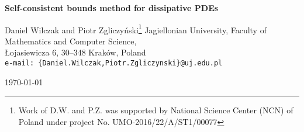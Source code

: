 \documentclass{article}
\begin{document}
\begin{center}
{\Large \bf  Self-consistent bounds method for dissipative PDEs}

 \vskip 0.5cm
{\large Daniel Wilczak} and {\large Piotr Zgliczy\'nski}\footnote{Work of D.W. and P.Z. was supported by National Science Center (NCN) of Poland under project No. UMO-2016/22/A/ST1/00077} %
 \vskip 0.2cm
  Jagiellonian University, Faculty of Mathematics and Computer Science, \\
  \L ojasiewicza 6, 30--348  Krak\'ow, Poland \\ \texttt{e-mail:\,\{Daniel.Wilczak,Piotr.Zgliczynski\}@uj.edu.pl}
\vskip 0.5cm

\today
\end{center}

\begin{abstract}
 We discuss the method of self-consistent bounds for dissipative PDEs with periodic boundary conditions. We prove convergence theorems for a class of dissipative PDEs, which constitute a theoretical basis of a general framework for construction of an algorithm that computes bounds for the solutions of the underlying PDE and its dependence on initial conditions. 
 
 We also show, that the classical examples of parabolic PDEs including Kuramoto-Sivashinsky equation and the Navier-Stokes on the torus fit into this framework. 
\end{abstract}





















%


%


\end{document}
